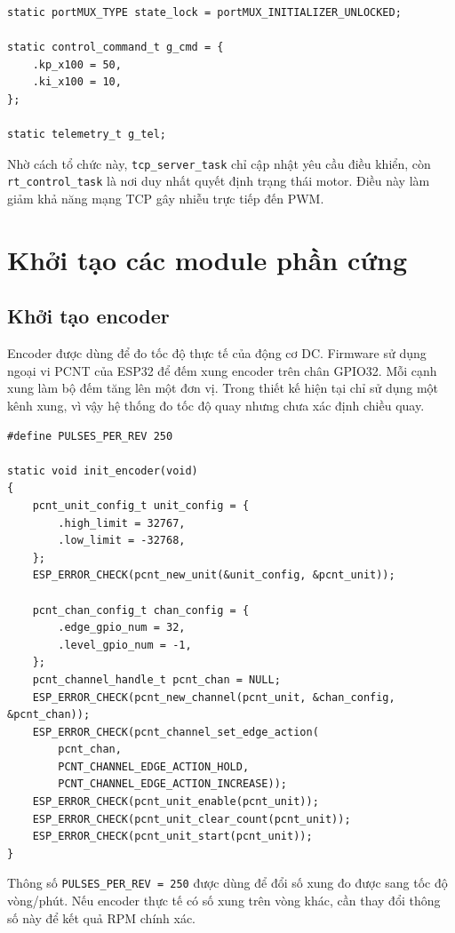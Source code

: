 \documentclass[12pt,a4paper]{report}
\begin{document}
\begin{lstlisting}
static portMUX_TYPE state_lock = portMUX_INITIALIZER_UNLOCKED;

static control_command_t g_cmd = {
    .kp_x100 = 50,
    .ki_x100 = 10,
};

static telemetry_t g_tel;
\end{lstlisting}

Nhờ cách tổ chức này, \texttt{tcp\_server\_task} chỉ cập nhật yêu cầu điều khiển, còn \texttt{rt\_control\_task} là nơi duy nhất quyết định trạng thái motor. Điều này làm giảm khả năng mạng TCP gây nhiễu trực tiếp đến PWM.

\section{Khởi tạo các module phần cứng}

\subsection{Khởi tạo encoder}

Encoder được dùng để đo tốc độ thực tế của động cơ DC. Firmware sử dụng ngoại vi PCNT của ESP32 để đếm xung encoder trên chân GPIO32. Mỗi cạnh xung làm bộ đếm tăng lên một đơn vị. Trong thiết kế hiện tại chỉ sử dụng một kênh xung, vì vậy hệ thống đo tốc độ quay nhưng chưa xác định chiều quay.

\begin{lstlisting}
#define PULSES_PER_REV 250

static void init_encoder(void)
{
    pcnt_unit_config_t unit_config = {
        .high_limit = 32767,
        .low_limit = -32768,
    };
    ESP_ERROR_CHECK(pcnt_new_unit(&unit_config, &pcnt_unit));

    pcnt_chan_config_t chan_config = {
        .edge_gpio_num = 32,
        .level_gpio_num = -1,
    };
    pcnt_channel_handle_t pcnt_chan = NULL;
    ESP_ERROR_CHECK(pcnt_new_channel(pcnt_unit, &chan_config, &pcnt_chan));
    ESP_ERROR_CHECK(pcnt_channel_set_edge_action(
        pcnt_chan,
        PCNT_CHANNEL_EDGE_ACTION_HOLD,
        PCNT_CHANNEL_EDGE_ACTION_INCREASE));
    ESP_ERROR_CHECK(pcnt_unit_enable(pcnt_unit));
    ESP_ERROR_CHECK(pcnt_unit_clear_count(pcnt_unit));
    ESP_ERROR_CHECK(pcnt_unit_start(pcnt_unit));
}
\end{lstlisting}

Thông số \texttt{PULSES\_PER\_REV = 250} được dùng để đổi số xung đo được sang tốc độ vòng/phút. Nếu encoder thực tế có số xung trên vòng khác, cần thay đổi thông số này để kết quả RPM chính xác.
\end{document}
